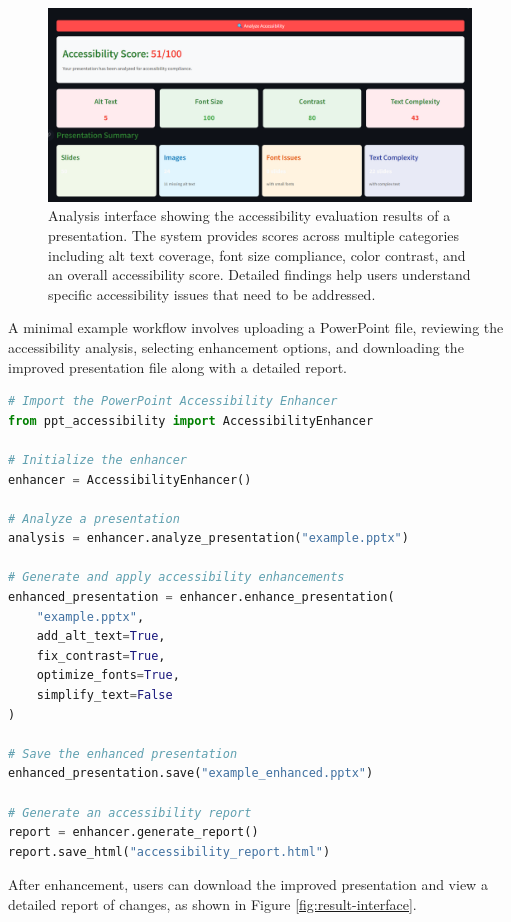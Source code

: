 \documentclass[preprint,review,12pt]{elsarticle} %
\begin{document}
\begin{figure}[h]
    \centering
    \includegraphics[width=\textwidth]{Figures/fig2_ppp.png}
    \caption{Analysis interface showing the accessibility evaluation results of a presentation. The system provides scores across multiple categories including alt text coverage, font size compliance, color contrast, and an overall accessibility score. Detailed findings help users understand specific accessibility issues that need to be addressed.}
    \label{fig:analysis-interface}
\end{figure}

A minimal example workflow involves uploading a PowerPoint file, reviewing the accessibility analysis, selecting enhancement options, and downloading the improved presentation file along with a detailed report.

\begin{lstlisting}[language=Python, caption=Example code for analyzing presentation accessibility]
# Import the PowerPoint Accessibility Enhancer
from ppt_accessibility import AccessibilityEnhancer

# Initialize the enhancer
enhancer = AccessibilityEnhancer()

# Analyze a presentation
analysis = enhancer.analyze_presentation("example.pptx")

# Generate and apply accessibility enhancements
enhanced_presentation = enhancer.enhance_presentation(
    "example.pptx",
    add_alt_text=True,
    fix_contrast=True,
    optimize_fonts=True,
    simplify_text=False
)

# Save the enhanced presentation
enhanced_presentation.save("example_enhanced.pptx")

# Generate an accessibility report
report = enhancer.generate_report()
report.save_html("accessibility_report.html")
\end{lstlisting}

After enhancement, users can download the improved presentation and view a detailed report of changes, as shown in Figure \ref{fig:result-interface}.
\end{document}
